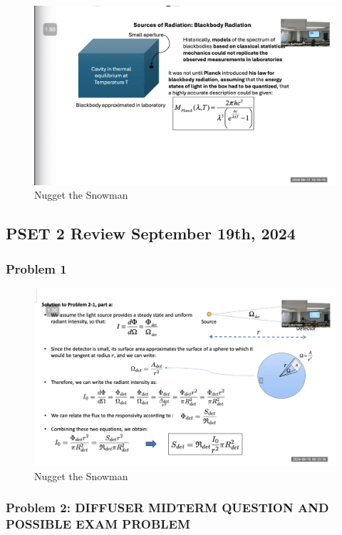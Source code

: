 \documentclass{article}
\begin{document}
\begin{figure}[h!]
\centering
\includegraphics[scale=.6]{Radiometry/Week4/Notes/Sept17/Blackbody2.png}
\caption{Nugget the Snowman}
\label{fig:Blackbody2}
\end{figure}
\clearpage

\subsection{PSET 2 Review September 19th, 2024}

\subsubsection{Problem 1}
\begin{figure}[h!]
\centering
\includegraphics[scale=.6]{Radiometry/Week4/Notes/PSET2/P1.png}
\caption{Nugget the Snowman}
\label{fig:P1}
\end{figure}
\subsubsection{Problem 2: DIFFUSER MIDTERM QUESTION AND POSSIBLE EXAM PROBLEM
}
\end{document}
